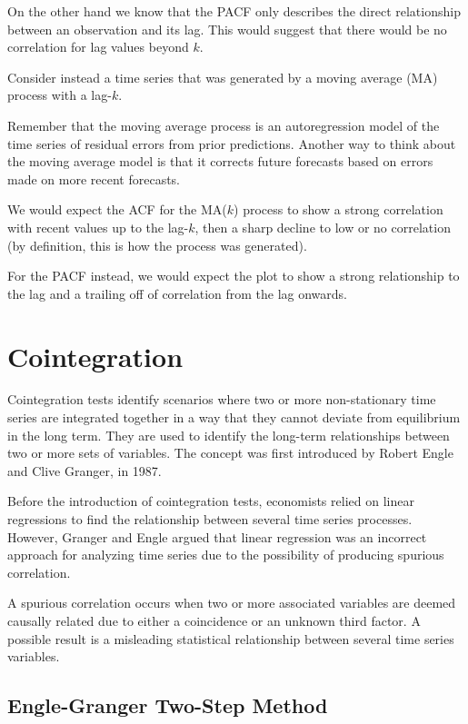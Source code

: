 On the other hand we know that the PACF only describes the direct relationship between an observation and its lag. This would suggest that there would be no correlation for lag values beyond \(k\).

Consider instead a time series that was generated by a moving average (MA)
process with a lag-\(k\).

Remember that the moving average process is an autoregression model of
the time series of residual errors from prior predictions. Another way
to think about the moving average model is that it corrects future
forecasts based on errors made on more recent forecasts.

We would expect the ACF for the MA(\(k\)) process to show a strong
correlation with recent values up to the lag-\(k\), then a sharp decline
to low or no correlation (by definition, this is how the process was
generated).

For the PACF instead, we would expect the plot to show a strong 
relationship to the lag and a trailing off of correlation 
from the lag onwards.

\section{Cointegration}\label{cointegration}

Cointegration tests identify scenarios where two or more non-stationary
time series are integrated together in a way that they cannot deviate
from equilibrium in the long term. They are used to identify the
long-term relationships between two or more sets of variables. The
concept was first introduced by Robert Engle and Clive Granger, in 1987.

Before the introduction of cointegration tests, economists relied on
linear regressions to find the relationship between several time series
processes. However, Granger and Engle argued that linear regression
was an incorrect approach for analyzing time series due to the
possibility of producing spurious correlation.

A spurious correlation occurs when two or more associated variables are
deemed causally related due to either a coincidence or an unknown third
factor. A possible result is a misleading statistical relationship
between several time series variables.

\subsection{Engle-Granger Two-Step Method}
\label{engle-granger-two-step-method}

